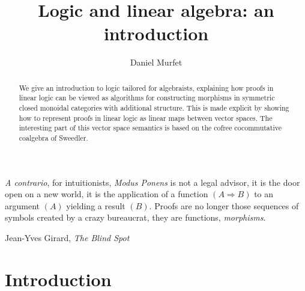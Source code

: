 \documentclass[english,letter paper,12pt,reqno]{article}
\theoremstyle{example}
\def\res{\operatorname{Res}}
\begin{document}
\def\ScoreOverhang{1pt}

\def\Res{\res\!}
\newcommand{\ud}[1]{\operatorname{d}\!{#1}}
\newcommand{\Ress}[1]{\res_{#1}\!}
\newcommand{\cat}[1]{\mathcal{#1}}
\newcommand{\lto}{\longrightarrow}
\newcommand{\xlto}[1]{\stackrel{#1}\lto}
\newcommand{\mf}[1]{\mathfrak{#1}}
\newcommand{\md}[1]{\mathscr{#1}}
\newcommand{\church}[1]{\underline{#1}}
\newcommand{\prf}[1]{\underline{#1}}
\newcommand{\den}[1]{\llbracket #1 \rrbracket}
\def\l{\,|\,}
\def\sgn{\textup{sgn}}
\def\cont{\operatorname{cont}}

\title{Logic and linear algebra: an introduction}
\author{Daniel Murfet}

\maketitle

\begin{abstract} We give an introduction to logic tailored for algebraists, explaining how proofs in linear logic can be viewed as algorithms for constructing morphisms in symmetric closed monoidal categories with additional structure. This is made explicit by showing how to represent proofs in linear logic as linear maps between vector spaces. The interesting part of this vector space semantics is based on the cofree cocommutative coalgebra of Sweedler.
\end{abstract}

\setlength{\epigraphwidth}{0.6\textwidth}
\epigraph{\emph{A contrario}, for intuitionists, \emph{Modus Ponens} is not a legal advisor, it is the door open on a new world, it is the application of a function $(A \Rightarrow B)$ to an argument $(A)$ yielding a result $(B)$. Proofs are no longer those sequences of symbols created by a crazy bureaucrat, they are functions, \emph{morphisms}.}{Jean-Yves Girard, \textit{The Blind Spot}}

\tableofcontents

\section{Introduction}

\end{document}
